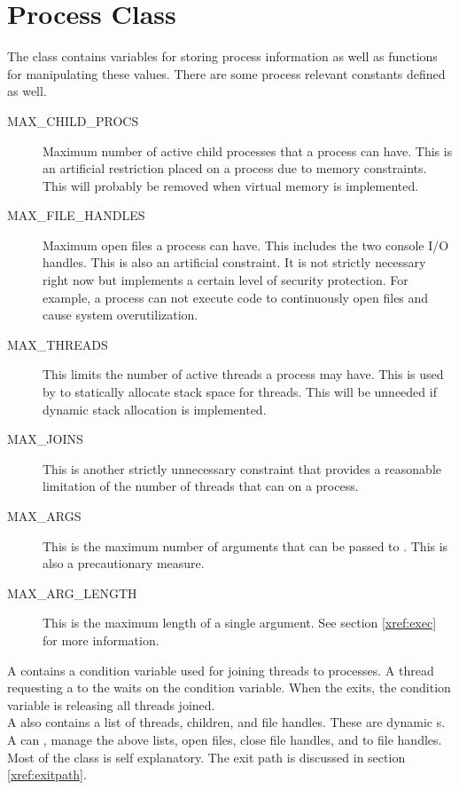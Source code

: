   \section{Process Class}
  \label{xref:proc}
    The  class contains variables for storing process information as well
    as functions for manipulating these values. There are some process relevant constants
    defined as well.
    \begin{description}
      \item[MAX\_CHILD\_PROCS] Maximum number of active child processes that a process can
	have. This is an artificial restriction placed on a process due to memory
	constraints. This will probably be removed when virtual memory is implemented.
      \item[MAX\_FILE\_HANDLES] Maximum open files a process can have. This includes the
	two console I/O handles. This is also an artificial constraint. It is not
	strictly necessary right now but implements a certain level of security
	protection. For example, a process can not execute code to continuously open
	files and cause system overutilization.
      \item[MAX\_THREADS] This limits the number of active threads a process may have.
	This is used by  to statically allocate stack space for threads.
	This will be unneeded if dynamic stack allocation is implemented.
      \item[MAX\_JOINS] This is another strictly unnecessary constraint that provides
	a reasonable limitation of the number of threads that can  on a
	process.
      \item[MAX\_ARGS] This is the maximum number of arguments that can be passed to
	. This is also a precautionary measure.
      \item[MAX\_ARG\_LENGTH] This is the maximum length of a single argument. See section
	\ref{xref:exec} for more information.
    \end{description}

    A  contains a condition variable used for joining threads to processes.
    A thread requesting a  to the  waits on the condition
    variable. When the  exits, the condition variable is 
    releasing all threads joined.\\

    A  also contains a list of threads, children, and file handles. These
    are dynamic s. A  can , manage the above lists,
    open files, close file handles,  and  to file handles.
    Most of the  class is self explanatory. The exit path is discussed in
    section \ref{xref:exitpath}.
  
